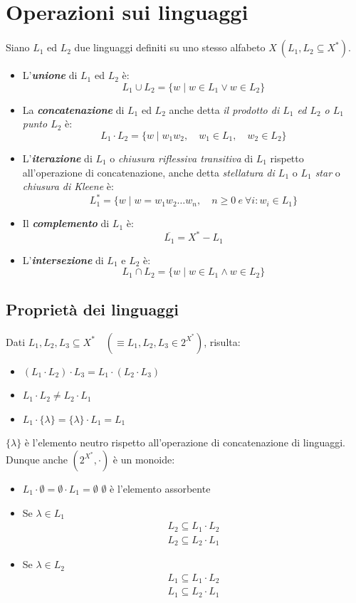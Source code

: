 \documentclass[12pt]{report}
\begin{document}
\section{Operazioni sui linguaggi}
Siano $L_1$ ed $L_2$ due linguaggi definiti su uno stesso alfabeto $X\ (L_1, L_2 \subseteq X^*)$.
\begin{itemize}
	\item L'\textit{\textbf{unione}} di $L_1$ ed $L_2$ è:
	\[
	L_1 \cup L_2 = \{w \mid w \in L_1 \vee w \in L_2 \}
	\]
	\item La \textit{\textbf{concatenazione}} di $L_1$ ed $L_2$ anche detta \textit{il prodotto di $L_1$ ed $L_2$ o $L_1$ punto $L_2$} è:
	\[
	L_1 \cdot L_2 = \{w \mid w_1w_2, \quad w_1 \in L_1, \quad w_2 \in L_2\}
	\]
	\item L'\textit{\textbf{iterazione}} di $L_1$ o \textit{chiusura riflessiva transitiva} di $L_1$ rispetto all'operazione di concatenazione, anche detta \textit{stellatura di $L_1$} o \textit{$L_1$ star} o \textit{chiusura di Kleene} è:
	\[
	L_1^* = \{w \mid w = w_1w_2\dots w_n, \quad n \geq 0 \ e\ \forall i: w_i \in L_1\}
	\]
	\item Il \textit{\textbf{complemento}} di $L_1$ è:
	\[
	\overline{L_1} = X^* - L_1
	\]
	\item L'\textit{\textbf{intersezione}} di $L_1$ e $L_2$ è:
	\[
	L_1 \cap L_2 = \{w \mid w \in L_1 \wedge w \in L_2\}
	\]
\end{itemize}
\subsection{Proprietà dei linguaggi}
Dati $L_1, L_2, L_3 \subseteq X^* \quad (\equiv L_1, L_2, L_3 \in 2^{X^*})$, risulta:
\begin{itemize}
	\item $(L_1 \cdot L_2) \cdot L_3 = L_1 \cdot (L_2 \cdot L_3)$
	\item $L_1 \cdot L_2 \neq L_2 \cdot L_1$
	\item $L_1 \cdot \{\lambda\} = \{\lambda\} \cdot L_1 = L_1$
\end{itemize}
$\{\lambda\}$ è l'elemento neutro rispetto all'operazione di concatenazione di linguaggi. \\
Dunque anche $(2^{X^*}, \cdot)$ è un monoide:
\begin{itemize}
	\item $L_1 \cdot \emptyset = \emptyset \cdot L_1 = \emptyset$ \quad $\emptyset$ è l'elemento assorbente
	\item Se $\lambda \in L_1 \quad$ \begin{align*}
		L_2 \subseteq L_1 \cdot L_2 \\
		L_2 \subseteq L_2 \cdot L_1
	\end{align*}
	\item Se $\lambda \in L_2 \quad $ \begin{align*}
		L_1 \subseteq L_1 \cdot L_2 \\
		L_1 \subseteq L_2 \cdot L_1
	\end{align*}
	\end{itemize}
\end{document}
